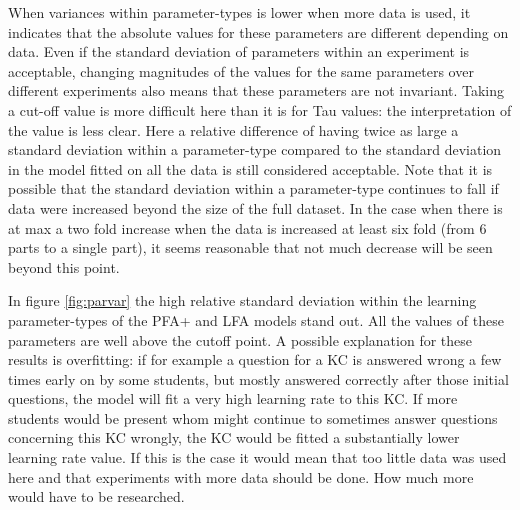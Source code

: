 \documentclass{scrartcl}
\begin{document}
When variances within parameter-types is lower when more data is used, it indicates that the absolute values for these parameters are different depending on data. Even if the standard deviation of parameters within an experiment is acceptable, changing magnitudes of the values for the same parameters over different experiments also means that these parameters are not invariant. Taking a cut-off value is more difficult here than it is for Tau values: the interpretation of the value is less clear. Here a relative difference of having twice as large a standard deviation within a parameter-type compared to the standard deviation in the model fitted on all the data is still considered acceptable. Note that it is possible that the standard deviation within a parameter-type continues to fall if data were increased beyond the size of the full dataset. In the case when there is at max a two fold increase when the data is increased at least six fold (from 6 parts to a single part), it seems reasonable that not much decrease will be seen beyond this point.

In figure \ref{fig:parvar} the high relative standard deviation within the learning parameter-types of the PFA+ and LFA models stand out. All the values of these parameters are well above the cutoff point. A possible explanation for these results is overfitting: if for example a question for a KC is answered wrong a few times early on by some students, but mostly answered correctly after those initial questions, the model will fit a very high learning rate to this KC. If more students would be present whom might continue to sometimes answer questions concerning this KC wrongly, the KC would be fitted a substantially lower learning rate value. If this is the case it would mean that too little data was used here and that experiments with more data should be done. How much more would have to be researched.
\end{document}
